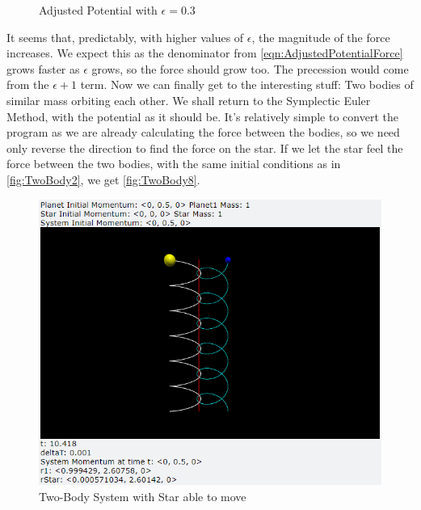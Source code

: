 \documentclass[12pt]{article}
\begin{document}
\begin{enumerate}
\begin{figure}[H]
\begin{center}
               \caption{Adjusted Potential with $\epsilon = 0.3$}
               \label{fig:TwoBody7}
            \end{center}
        \end{figure}
        \noindent
        It seems that, predictably, with higher values of $\epsilon$, the magnitude of the force increases. 
        We expect this as the denominator from \autoref{eqn:AdjustedPotentialForce} grows faster as 
        $\epsilon$ grows, so the force should grow too. The precession would come from the $\epsilon+1$ 
        term.        
        \newline
        Now we can finally get to the interesting stuff: Two bodies of similar mass orbiting each other. 
        We shall return to the Symplectic Euler Method, with the potential as it should be. 
        It's relatively simple to convert the program as we are already calculating the force between the 
        bodies, so we need only reverse the direction to find the force on the star. If we let the 
        star feel the force between the two bodies, with the same initial conditions as in 
        \autoref{fig:TwoBody2}, we get \autoref{fig:TwoBody8}. 
        \begin{figure}[h]
            \begin{center}
               \includegraphics[scale=.5]{TwoBody8}
               \caption{Two-Body System with Star able to move}
               \label{fig:TwoBody8}
            \end{center}
        \end{figure}

\end{enumerate}
\end{document}
